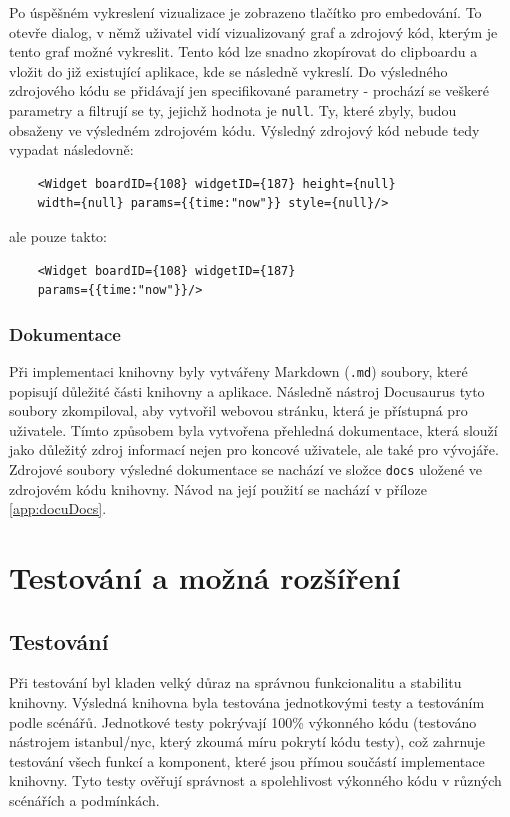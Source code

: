 \documentclass[czech, bc, kiv, he, iso690numb]{fasthesis}
\begin{document}
Po úspěšném vykreslení vizualizace je zobrazeno tlačítko pro embedování. To otevře dialog, v němž uživatel vidí vizualizovaný graf a zdrojový kód, kterým je tento graf možné vykreslit.
Tento kód lze snadno zkopírovat do clipboardu a vložit do již existující aplikace, kde se následně vykreslí. Do výsledného zdrojového kódu se přidávají jen specifikované parametry -
prochází se veškeré parametry a filtrují se ty, jejichž hodnota je \texttt{null}. Ty, které zbyly, budou obsaženy ve výsledném zdrojovém kódu. Výsledný zdrojový kód nebude tedy vypadat následovně:
\begin{lstlisting}
	<Widget boardID={108} widgetID={187} height={null}
	width={null} params={{time:"now"}} style={null}/>
\end{lstlisting}
ale pouze takto:
\begin{lstlisting}
	<Widget boardID={108} widgetID={187} 
	params={{time:"now"}}/>
\end{lstlisting}

\subsection{Dokumentace}

Při implementaci knihovny byly vytvářeny Markdown (\texttt{.md}) soubory, které popisují důležité části knihovny a aplikace. Následně nástroj Docusaurus tyto soubory zkompiloval,
aby vytvořil webovou stránku, která je přístupná pro uživatele. Tímto způsobem byla vytvořena přehledná dokumentace, která slouží jako důležitý zdroj informací nejen pro koncové uživatele,
ale také pro vývojáře. Zdrojové soubory výsledné dokumentace se nachází ve složce \texttt{docs} uložené ve zdrojovém kódu knihovny. Návod na její použití se nachází v příloze \ref{app:docuDocs}.

\chapter{Testování a možná rozšíření}
\section{Testování}
Při testování byl kladen velký důraz na správnou funkcionalitu a stabilitu knihovny. Výsledná knihovna byla testována jednotkovými testy a testováním podle
scénářů. Jednotkové testy pokrývají 100\% výkonného kódu (testováno nástrojem istanbul/nyc, který zkoumá míru pokrytí kódu testy), což zahrnuje testování všech funkcí a komponent, 
které jsou přímou součástí implementace knihovny.
Tyto testy ověřují správnost a spolehlivost výkonného kódu v různých scénářích a podmínkách.
\end{document}
